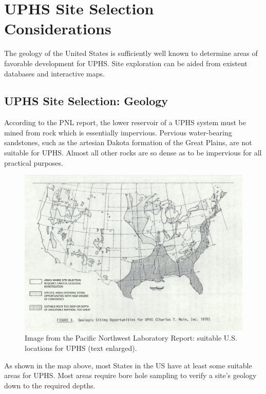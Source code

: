 \documentclass[hidelinks,12pt,a4paper]{article}
\begin{document}
\pagebreak[4]
\section{UPHS Site Selection Considerations}
The geology of the United States is sufficiently well known to determine areas of favorable development for UPHS. Site exploration can be aided from existent databases and interactive maps.

\subsection{UPHS Site Selection: Geology}
According to the PNL report, the lower reservoir of a UPHS system must be mined from rock which is essentially impervious. Pervious water-bearing sandstones, such as the artesian Dakota formation of the Great Plains, are not suitable for UPHS. Almost all other rocks are so dense as to be impervious for all practical purposes. \cite{UndergroundPumpedHydroelectricStorage}

\begin{figure}[ht!]
    \centering
    \includegraphics[width=1\textwidth]{pnl-report-geologic-siting-opportunities-for-uphs-text-overlay.jpg}
    \caption{Image from the Pacific Northwest Laboratory Report: suitable U.S. locations for UPHS (text enlarged). \cite{UndergroundPumpedHydroelectricStorage}}
\end{figure}
\FloatBarrier

As shown in the map above, most States in the US have at least some suitable areas for UPHS. Most areas require bore hole sampling to verify a site's geology down to the required depths.
\end{document}
